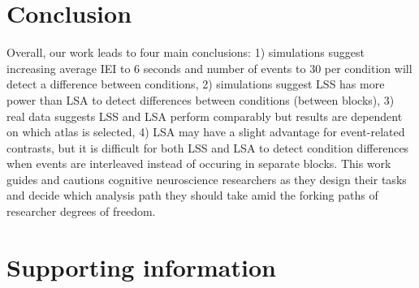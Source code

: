 \documentclass[10pt,letterpaper]{article}
\begin{document}
\section*{Conclusion}

Overall, our work leads to four main conclusions:
1) simulations suggest increasing average IEI to 6 seconds and number of events to 30 per condition will detect a difference between conditions, 
2) simulations suggest LSS has more power than LSA to detect differences between conditions (between blocks),
3) real data suggests LSS and LSA perform comparably but results are dependent on which atlas is selected,
4) LSA may have a slight advantage for event-related contrasts,
but it is difficult for both LSS and LSA to detect condition differences when events are interleaved instead of occuring in separate blocks.
This work guides and cautions cognitive neuroscience researchers as they design their tasks and decide
which analysis path they should take amid the forking paths of researcher degrees of freedom.




\section*{Supporting information}

\end{document}

